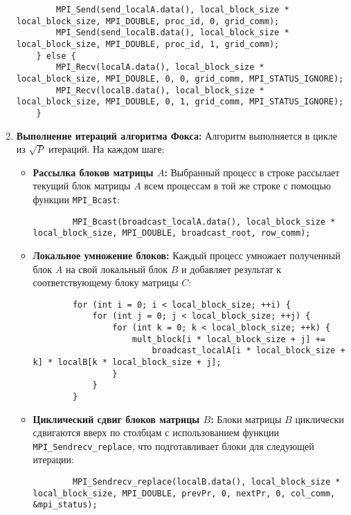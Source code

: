 \documentclass{report}
\begin{document}
\begin{enumerate}
\begin{lstlisting}
        MPI_Send(send_localA.data(), local_block_size * local_block_size, MPI_DOUBLE, proc_id, 0, grid_comm);
        MPI_Send(send_localB.data(), local_block_size * local_block_size, MPI_DOUBLE, proc_id, 1, grid_comm);
    } else {
        MPI_Recv(localA.data(), local_block_size * local_block_size, MPI_DOUBLE, 0, 0, grid_comm, MPI_STATUS_IGNORE);
        MPI_Recv(localB.data(), local_block_size * local_block_size, MPI_DOUBLE, 0, 1, grid_comm, MPI_STATUS_IGNORE);
    }
    \end{lstlisting}

    \item \textbf{Выполнение итераций алгоритма Фокса:}  
    Алгоритм выполняется в цикле из $\sqrt{P}$ итераций. На каждом шаге:
    \begin{itemize}
        \item \textbf{Рассылка блоков матрицы $A$:} Выбранный процесс в строке рассылает текущий блок матрицы $A$ всем процессам в той же строке с помощью функции \texttt{MPI\_Bcast}:
        \begin{lstlisting}
        MPI_Bcast(broadcast_localA.data(), local_block_size * local_block_size, MPI_DOUBLE, broadcast_root, row_comm);
        \end{lstlisting}

        \item \textbf{Локальное умножение блоков:} Каждый процесс умножает полученный блок $A$ на свой локальный блок $B$ и добавляет результат к соответствующему блоку матрицы $C$:
        \begin{lstlisting}
        for (int i = 0; i < local_block_size; ++i) {
            for (int j = 0; j < local_block_size; ++j) {
                for (int k = 0; k < local_block_size; ++k) {
                    mult_block[i * local_block_size + j] +=
                        broadcast_localA[i * local_block_size + k] * localB[k * local_block_size + j];
                }
            }
        }
        \end{lstlisting}

        \item \textbf{Циклический сдвиг блоков матрицы $B$:} Блоки матрицы $B$ циклически сдвигаются вверх по столбцам с использованием функции \texttt{MPI\_Sendrecv\_replace}, что подготавливает блоки для следующей итерации:
        \begin{lstlisting}
        MPI_Sendrecv_replace(localB.data(), local_block_size * local_block_size, MPI_DOUBLE, prevPr, 0, nextPr, 0, col_comm, &mpi_status);
        \end{lstlisting}
    \end{itemize}


\end{enumerate}
\end{document}
